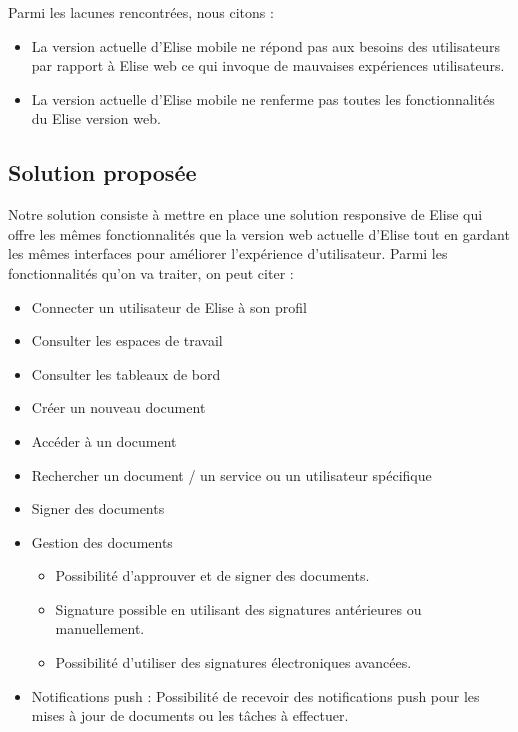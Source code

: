 Parmi les lacunes rencontrées, nous citons :
\begin{itemize}
  \item La version actuelle d'Elise mobile ne répond pas aux besoins des utilisateurs par rapport à Elise web ce qui invoque de mauvaises expériences utilisateurs.
  \item La version actuelle d'Elise mobile ne renferme pas toutes les fonctionnalités du Elise version web.
\end{itemize}

\subsection{Solution proposée}
Notre solution consiste à mettre en place une solution responsive de Elise qui offre les mêmes fonctionnalités que la version web actuelle d'Elise tout en gardant les mêmes interfaces pour améliorer l'expérience d'utilisateur. Parmi les fonctionnalités qu'on va traiter, on peut citer :

\begin{itemize}
  \item Connecter un utilisateur de Elise à son profil
  \item Consulter les espaces de travail
  \item	Consulter les tableaux de bord
  \item	Créer un nouveau document
  \item Accéder à un document
  \item Rechercher un document / un service ou un utilisateur spécifique
  \item Signer des documents
  \item	Gestion des documents
  \begin{itemize}
    \item Possibilité d'approuver et de signer des documents.
    \item Signature possible en utilisant des signatures antérieures ou manuellement.
    \item Possibilité d'utiliser des signatures électroniques avancées.
  \end{itemize}
  \item Notifications push : Possibilité de recevoir des notifications push pour les mises à jour de documents ou les tâches à effectuer.
\end{itemize}

